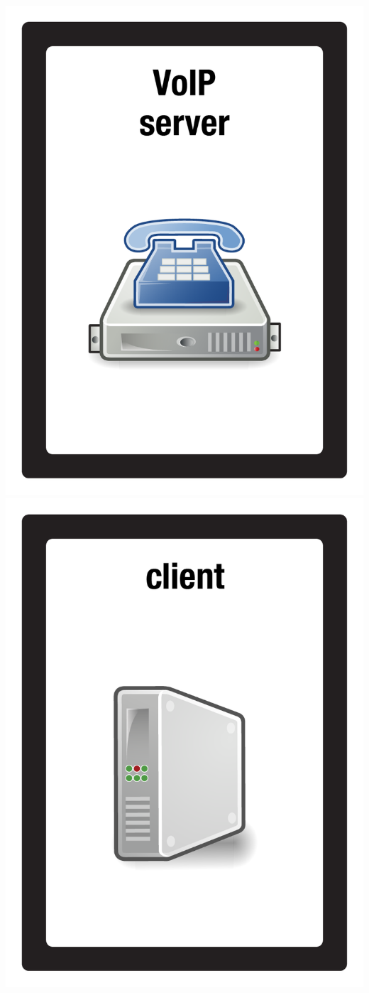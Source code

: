 \documentclass{letter}
\begin{document}
\includegraphics{patch/patch_voip_server}
\includegraphics{patch/patch_client_tower}
\end{document}
